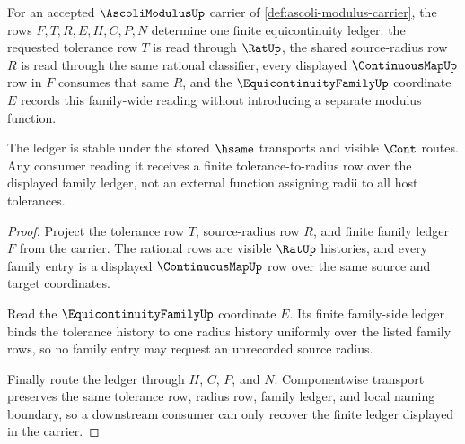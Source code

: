 \begin{theorem}
\label{thm:ascoli-modulus-equicontinuity-ledger}
For an accepted $\AscoliModulusUp$ carrier of \autoref{def:ascoli-modulus-carrier}, the rows $F,T,R,E,H,C,P,N$ determine one finite equicontinuity ledger: the requested tolerance row $T$ is read through $\RatUp$, the shared source-radius row $R$ is read through the same rational classifier, every displayed $\ContinuousMapUp$ row in $F$ consumes that same $R$, and the $\EquicontinuityFamilyUp$ coordinate $E$ records this family-wide reading without introducing a separate modulus function.

The ledger is stable under the stored $\hsame$ transports and visible $\Cont$ routes. Any consumer reading it receives a finite tolerance-to-radius row over the displayed family ledger, not an external function assigning radii to all host tolerances.
\end{theorem}
\begin{proof}
Project the tolerance row $T$, source-radius row $R$, and finite family ledger $F$ from the carrier. The rational rows are visible $\RatUp$ histories, and every family entry is a displayed $\ContinuousMapUp$ row over the same source and target coordinates.

Read the $\EquicontinuityFamilyUp$ coordinate $E$. Its finite family-side ledger binds the tolerance history to one radius history uniformly over the listed family rows, so no family entry may request an unrecorded source radius.

Finally route the ledger through $H$, $C$, $P$, and $N$. Componentwise transport preserves the same tolerance row, radius row, family ledger, and local naming boundary, so a downstream consumer can only recover the finite ledger displayed in the carrier.
\end{proof}

